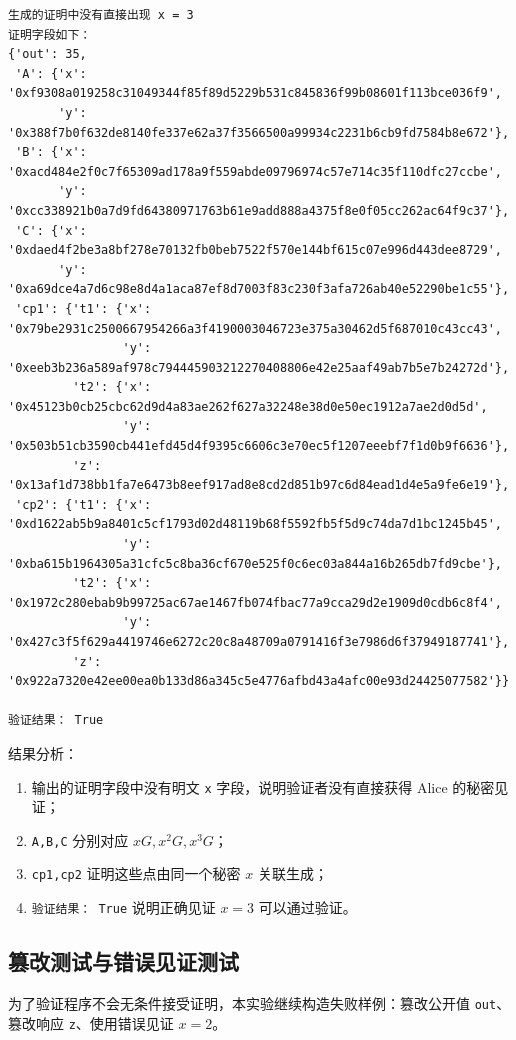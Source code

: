 \documentclass[a4paper]{article}
\begin{document}
	\begin{lstlisting}[caption={正确证明运行结果}]
生成的证明中没有直接出现 x = 3
证明字段如下：
{'out': 35,
 'A': {'x': '0xf9308a019258c31049344f85f89d5229b531c845836f99b08601f113bce036f9',
       'y': '0x388f7b0f632de8140fe337e62a37f3566500a99934c2231b6cb9fd7584b8e672'},
 'B': {'x': '0xacd484e2f0c7f65309ad178a9f559abde09796974c57e714c35f110dfc27ccbe',
       'y': '0xcc338921b0a7d9fd64380971763b61e9add888a4375f8e0f05cc262ac64f9c37'},
 'C': {'x': '0xdaed4f2be3a8bf278e70132fb0beb7522f570e144bf615c07e996d443dee8729',
       'y': '0xa69dce4a7d6c98e8d4a1aca87ef8d7003f83c230f3afa726ab40e52290be1c55'},
 'cp1': {'t1': {'x': '0x79be2931c2500667954266a3f4190003046723e375a30462d5f687010c43cc43',
                'y': '0xeeb3b236a589af978c794445903212270408806e42e25aaf49ab7b5e7b24272d'},
         't2': {'x': '0x45123b0cb25cbc62d9d4a83ae262f627a32248e38d0e50ec1912a7ae2d0d5d',
                'y': '0x503b51cb3590cb441efd45d4f9395c6606c3e70ec5f1207eeebf7f1d0b9f6636'},
         'z': '0x13af1d738bb1fa7e6473b8eef917ad8e8cd2d851b97c6d84ead1d4e5a9fe6e19'},
 'cp2': {'t1': {'x': '0xd1622ab5b9a8401c5cf1793d02d48119b68f5592fb5f5d9c74da7d1bc1245b45',
                'y': '0xba615b1964305a31cfc5c8ba36cf670e525f0c6ec03a844a16b265db7fd9cbe'},
         't2': {'x': '0x1972c280ebab9b99725ac67ae1467fb074fbac77a9cca29d2e1909d0cdb6c8f4',
                'y': '0x427c3f5f629a4419746e6272c20c8a48709a0791416f3e7986d6f37949187741'},
         'z': '0x922a7320e42ee00ea0b133d86a345c5e4776afbd43a4afc00e93d24425077582'}}

验证结果： True
	\end{lstlisting}
	
	结果分析：
	\begin{enumerate}
		\item 输出的证明字段中没有明文 \texttt{x} 字段，说明验证者没有直接获得 Alice 的秘密见证；
		\item \texttt{A,B,C} 分别对应 \(xG,x^{2}G,x^{3}G\)；
		\item \texttt{cp1,cp2} 证明这些点由同一个秘密 \(x\) 关联生成；
		\item \texttt{验证结果： True} 说明正确见证 \(x=3\) 可以通过验证。
	\end{enumerate}
	
	\subsection{篡改测试与错误见证测试}
	为了验证程序不会无条件接受证明，本实验继续构造失败样例：篡改公开值 \texttt{out}、篡改响应 \texttt{z}、使用错误见证 \(x=2\)。
	
\end{document}
